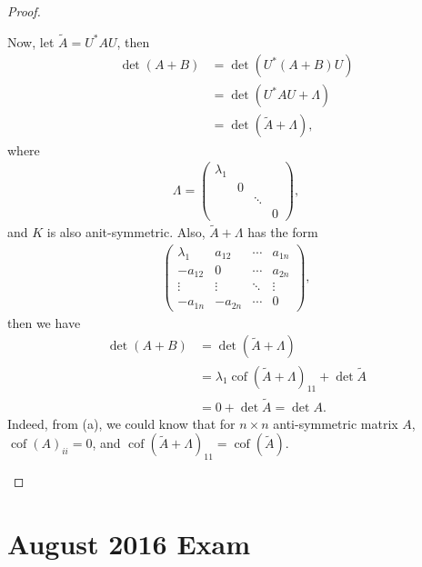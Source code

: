 \documentclass[11pt]{article}
\theoremstyle{definition}
\numberwithin{equation}{subsection}
\begin{document}
\begin{proof}
\begin{enumerate}[label=(\alph*)]
    Now, let $\widetilde{A} = U^*AU$, then
    \begin{align*}
        \det(A + B) & = \det\left(U^*(A + B)U\right) \\
        & = \det \left(U^*AU + \Lambda \right) \\
        & = \det (\widetilde{A} + \Lambda),
    \end{align*}
    where
    \begin{align*}
        \Lambda = \begin{pmatrix} 
            \lambda_1 &  &  &  \\
            & 0 &  &  \\
            &  & \ddots & \\
            &  &  & 0
        \end{pmatrix},
    \end{align*}
    and $K$ is also anit-symmetric. Also, $\widetilde{A} + \Lambda$ has the form 
    \begin{align*}
        \begin{pmatrix} 
            \lambda_1 & a_{12} & \cdots & a_{1n} \\
            -a_{12} & 0 & \cdots & a_{2n} \\
            \vdots & \vdots & \ddots & \vdots \\
            -a_{1n} & -a_{2n} & \cdots & 0
        \end{pmatrix},
    \end{align*}
    then we have
    \begin{align*}
        \det(A + B) & = \det (\widetilde{A} + \Lambda) \\
        & = \lambda_1 \operatorname{cof}(\widetilde{A} + \Lambda)_{11} + \det \widetilde{A} \\
        & = 0 + \det \widetilde{A} = \det A.
    \end{align*}
    Indeed, from (a), we could know that for $n \times n$ anti-symmetric matrix $A$, $\operatorname{cof}(A)_{ii} = 0$, and $\operatorname{cof}(\widetilde{A} + \Lambda)_{11} = \operatorname{cof}(\widetilde{A})$.
\end{enumerate}
\end{proof}


\newpage
\section{August 2016 Exam}
\end{document}
